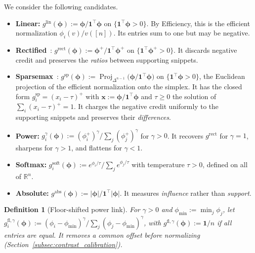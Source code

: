 \documentclass{article}
\newtheorem{definition}[theorem]{Definition}
\begin{document}
We consider the following candidates.
\begin{itemize}
    \item \textbf{Linear:} $g^{\text{lin}}(\boldsymbol{\phi}) := \boldsymbol{\phi} / \mathbf{1}^\top \boldsymbol{\phi}$ on $\{\mathbf{1}^\top \boldsymbol{\phi} > 0\}$. By Efficiency, this is the efficient normalization $\phi_i(v) / v([n])$. Its entries sum to one but may be negative.
    \item \textbf{Rectified}~\cite{nematov2025source}: $g^{\text{rect}}(\boldsymbol{\phi}) := \boldsymbol{\phi}^+ / \mathbf{1}^\top \boldsymbol{\phi}^+$ on $\{\mathbf{1}^\top \boldsymbol{\phi}^+ > 0\}$. It discards negative credit and preserves the \emph{ratios} between supporting snippets.
    \item \textbf{Sparsemax}~\cite{martins2016softmax}: $g^{\text{sp}}(\boldsymbol{\phi}) := \operatorname{Proj}_{\Delta^{n-1}}\big(\boldsymbol{\phi} / \mathbf{1}^\top \boldsymbol{\phi}\big)$ on $\{\mathbf{1}^\top \boldsymbol{\phi} > 0\}$, the Euclidean projection of the efficient normalization onto the simplex. It has the closed form $g^{\text{sp}}_i = (x_i - \tau)^+$ with $\mathbf{x} := \boldsymbol{\phi}/\mathbf{1}^\top\boldsymbol{\phi}$ and $\tau \ge 0$ the solution of $\sum_i (x_i - \tau)^+ = 1$. It charges the negative credit uniformly to the supporting snippets and preserves their \emph{differences}.
    \item \textbf{Power:} $g^{\gamma}_i(\boldsymbol{\phi}) := (\phi_i^+)^\gamma / \sum_j (\phi_j^+)^\gamma$ for $\gamma > 0$. It recovers $g^{\text{rect}}$ for $\gamma = 1$, sharpens for $\gamma > 1$, and flattens for $\gamma < 1$.
    \item \textbf{Softmax:} $g^{\text{soft}}_i(\boldsymbol{\phi}) := e^{\phi_i/\tau} / \sum_j e^{\phi_j/\tau}$ with temperature $\tau > 0$, defined on all of $\mathbb{R}^n$.
    \item \textbf{Absolute:} $g^{\text{abs}}(\boldsymbol{\phi}) := |\boldsymbol{\phi}| / \mathbf{1}^\top |\boldsymbol{\phi}|$. It measures \emph{influence} rather than \emph{support}.
\end{itemize}
\begin{definition}[Floor-shifted power link]\label{def:floor_link}
For $\gamma > 0$ and $\phi_{\min} := \min_j \phi_j$, let $g^{\text{fl},\gamma}_i(\boldsymbol{\phi}) := (\phi_i - \phi_{\min})^\gamma / \sum_j (\phi_j - \phi_{\min})^\gamma$, with $g^{\text{fl},\gamma}(\boldsymbol{\phi}) := \mathbf{1}/n$ if all entries are equal. It removes a common offset before normalizing (Section~\ref{subsec:contrast_calibration}).
\end{definition}
\end{document}
